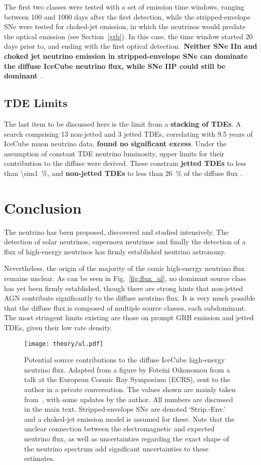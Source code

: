 The first two classes were tested with a set of emission time windows, ranging between 100 and 1000 days after the first detection, while the stripped-envelope SNe were tested for choked-jet emission, in which the neutrinos would predate the optical emission (see Section~\ref{grb}). In this case, the time window started 20 days prior to, and ending with the first optical detection.\ \textbf{Neither SNe IIn and choked jet neutrino emission in stripped-envelope SNe can dominate the diffuse IceCube neutrino flux, while SNe IIP could still be dominant}~\cite{Necker2023}.

\subsection{TDE Limits}
The last item to be discussed here is the limit from a \textbf{stacking of TDEs}. A search comprising 13 non-jetted and 3 jetted TDEs, correlating with 9.5 years of IceCube muon neutrino data, \textbf{found no significant excess}. Under the assumption of constant TDE neutrino luminosity, upper limits for their contribution to the diffuse were derived. These constrain \textbf{jetted TDEs} to less than \SI{\sim1}{\percent}, and \textbf{non-jetted TDEs} to less than \SI{26}{\percent} of the diffuse flux .

\section{Conclusion}
The neutrino has been proposed, discovered and studied intensively. The detection of solar neutrinos, supernova neutrinos and finally the detection of a flux of high-energy neutrinos has firmly established neutrino astronomy.

Nevertheless, the origin of the majority of the csmic high-energy neutrino flux remains unclear. As can be seen in Fig.~\ref{fig:flux_ul}, no dominant source class has yet been firmly established, though there are strong hints that non-jetted AGN contribute significantly to the diffuse neutrino flux. It is very much possible that the diffuse flux is composed of multiple source classes, each subdominant. The most stringent limits existing are those on prompt GRB emission and jetted TDEs, given their low rate density.

\begin{figure}[htb]
    \texttt{[image: theory/ul.pdf]}
    \caption[Contribution to HE neutrino flux]{Potential source contributions to the diffuse IceCube high-energy neutrino flux. Adapted from a figure by Foteini Oikonomou from a talk at the  European Cosmic Ray Symposium (ECRS), sent to the author in a private conversation. The values shown are mainly taken from~\cite{Guepin2022}, with some updates by the author. All numbers are discussed in the main text. Stripped-envelope SNe are denoted `Strip.-Env.' and a choked-jet emission model is assumed for these. Note that the unclear connection between the electromagnetic and expected neutrino flux, as well as uncertainties regarding the exact shape of the neutrino spectrum add significant uncertainties to these estimates.}
\end{figure}

